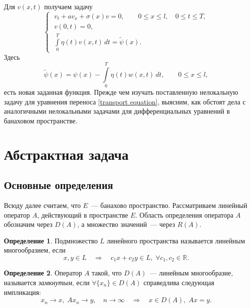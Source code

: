 \documentclass{article}
\renewcommand{\le}{\leqslant}
\theoremstyle{definition}
\newtheorem{definition}{Определение}
\begin{document}
Для $v(x,t)$ получаем задачу
\begin{equation} \label{reducted problem}
\begin{cases}
	\; v_t + av_x + \sigma(x)v = 0, \qquad 0 \le x \le l, \quad 0 \le t \le T, \\[3mm]
	\; v(0,t) = 0, \\[1mm]
	\; \int\limits_{0}^{T} \eta(t) v(x,t)\,dt = \widetilde{\psi}(x).
\end{cases}
\end{equation}
Здесь 
\begin{equation*}
	\widetilde{\psi}(x) = \psi(x) - \int\limits_{0}^{T} \eta(t) w(x,t)\,dt, \qquad 0 \le x \le l,
\end{equation*}
есть новая заданная функция.
\goodbreak
Прежде чем изучать поставленную нелокальную задачу для уравнения переноса \eqref{transport equation},
выясним, как обстоят дела с аналогичными нелокальными задачами для дифференциальных уравнений в банаховом пространстве.

\newpage

\section{Абстрактная задача}

\subsection{Основные определения}
Всюду далее считаем, что $E$~--- банахово пространство. Рассматриваем линейный оператор $A$, действующий в пространстве $E$.
Область определения оператора $A$ обозначим через $D(A)$, а множество значений~--- через $R(A)$.
\begin{definition} \label{linear manifold}
	Подмножество $L$ линейного пространства называется линейным многообразием, если
	\begin{equation*}
		x, y \in L \quad \Longrightarrow \quad c_1x + c_2y \in L, \; \forall c_1, c_2 \in \mathbb{R}.
	\end{equation*}
\end{definition}

\begin{definition} \label{closed operator}
	Оператор $A$ такой, что $ D(A) $~--- линейным многообразие,
	называется \textit{замкнутым}, если $\forall \{x_n\}  \in D(A)$ справедлива следующая импликация:
	\begin{equation*}
		x_n \rightarrow x, \; Ax_n \rightarrow y, \quad n \rightarrow \infty  \quad \Longrightarrow \quad x \in D(A), \; Ax = y. 
	\end{equation*}
\end{definition}
\end{document}
